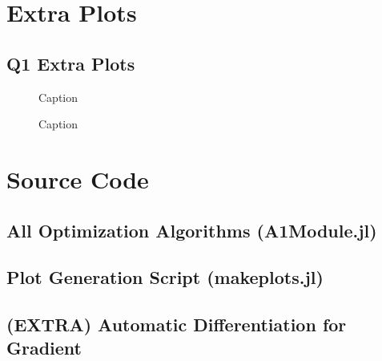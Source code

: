 \documentclass{article}
\begin{document}
    \appendix
    \section{Extra Plots}

    \subsection{Q1 Extra Plots}

    \begin{figure}[t]
        \centering
        
        \caption{Caption}
    \end{figure}
    
    \begin{figure}[h]
        \centering
        
        \caption{Caption}
    \end{figure}

    \section{Source Code}

    \subsection{All Optimization Algorithms (A1Module.jl)}

    \subsection{Plot Generation Script (makeplots.jl)}

    \subsection{(EXTRA) Automatic Differentiation for Gradient}

    
\end{document}
